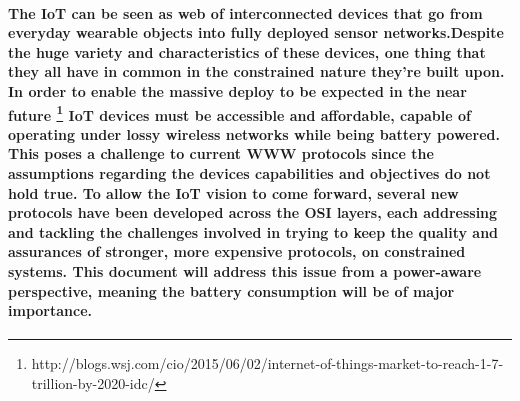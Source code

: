 \paragraph{
The \ac{IoT} can be seen as web of interconnected devices that go from everyday wearable objects into fully deployed sensor networks.Despite the huge variety and characteristics of these devices, one thing that they all have in common in the constrained nature they're built upon. In order to enable the massive deploy to be expected in the near future \footnote{http://blogs.wsj.com/cio/2015/06/02/internet-of-things-market-to-reach-1-7-trillion-by-2020-idc/} \ac{IoT} devices must be accessible and affordable, capable of operating under lossy wireless networks while being battery powered. This poses a challenge to current \ac{WWW} protocols since the assumptions regarding the devices capabilities and objectives do not hold true. To allow the \ac{IoT} vision to come forward, several new protocols have been developed across the OSI layers, each addressing and tackling the challenges involved in trying to keep the quality and assurances of stronger, more expensive protocols, on constrained systems. This document will address this issue from a power-aware perspective, meaning the battery consumption will be of major importance.
}
